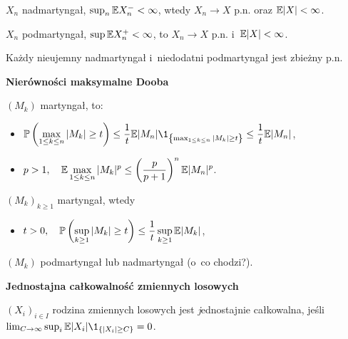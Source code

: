 



	\begin{theorem}
		$X_n$ nadmartyngał, $\sup_n \mathbb{E} X_n^- < \infty$, 
		wtedy $X_n \to X$ p.n. oraz $\mathbb{E} |X| < \infty$.
	\end{theorem}
	
	\begin{corollary}
		$X_n$ podmartyngał, $\sup \mathbb{E} X_n^+ < \infty$, to $X_n \to X$ p.n. 
		i~$\mathbb{E} |X| < \infty$.
	\end{corollary}
	
	\begin{corollary}
		Każdy nieujemny nadmartyngał i~niedodatni podmartyngał 
		jest zbieżny p.n.
	\end{corollary}
	
	{\bf Nierówności maksymalne Dooba}
	\begin{theorem}
		$(M_k)$ martyngał, to:
		\begin{itemize}
			\item $\displaystyle
			\P\left(\max_{1 \leq k \leq n} |M_k| \geq t\right)
			\leq
			\frac1t \E |M_n| 
				\1_{\left\{\max_{1 \leq k \leq n} |M_k| \geq t\right\}}
			\leq 
			\frac1t \E |M_n|$,
			
			\item $p>1, \quad \displaystyle
			\mathbb{E} \max_{1 \leq k \leq n} |M_k|^p 
			\leq 
			\left(\frac{p}{p+1}\right)^n \mathbb{E} |M_n|^p$.
		\end{itemize}

	\end{theorem}
	
	\begin{corollary}
		$(M_k)_{k \geq 1}$ martyngał, wtedy
		\begin{itemize}
			\item $t>0, \quad \displaystyle
			\mathbb{P}\left(\sup_{k \geq 1} |M_k| \geq t\right) 
			\leq
			\frac{1}{t} \sup_{k \geq 1} \mathbb{E} |M_k|$,
		\end{itemize}

	\end{corollary}
	
	\begin{corollary}
		$(M_k)$ podmartyngał lub nadmartyngał (o~co chodzi?).
	\end{corollary}
	
	{\bf Jednostajna całkowalność zmiennych losowych}
	\begin{definition}
		$(X_i)_{i \in I}$ rodzina zmiennych losowych jest 
		{\emph jednostajnie całkowalna}, jeśli \\
		${\lim_{C \to \infty} \sup_i \E |X_i|
			\1_{\{|X_i| \geq C \}} = 0}$.
	\end{definition}
	
